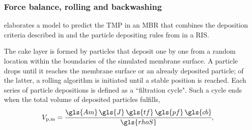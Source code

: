 
\subsubsection{Force balance, rolling and backwashing}
\cite{Smets} elaborates a model to predict the \gls{TMP} in an \gls{MBR} that combines the deposition criteria described in \cite{Broeckmann2006} and the particle depositing rules from \cite{Yoon1999} in a \gls{RIS}. \par
The cake layer is formed by particles that deposit one by one from a random location within the boundaries of the simulated membrane surface. A particle drops until it reaches the membrane surface or an already deposited particle; of the latter, a rolling algorithm is initiated until a stable position is reached. Each series of particle depositions is defined as a ``filtration cycle". Such a cycle ends when the total volume of deposited particles fulfills, 
\begin{equation}
V_{\mathrm{p,m}} = \cfrac{ \gls{Am} \, \gls{J}\, \gls{tf}\, \gls{pf} \, \gls{cb}}{\gls{rhoS}}
\label{CaoVmax} ,
\end{equation}

